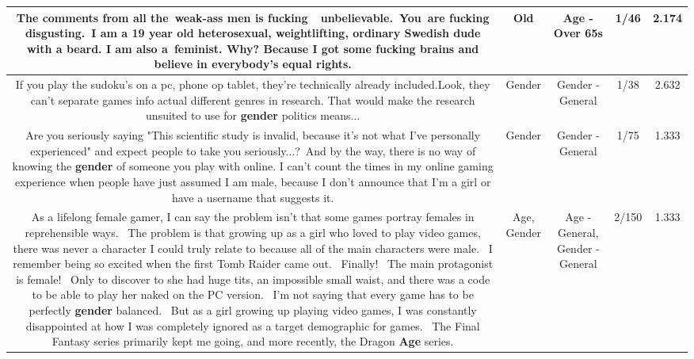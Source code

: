 \documentclass[11pt]{article}
\newlength\mylength
\begin{document}
\begin{center}
\begin{longtable}{|C{.65\mylength}|C{.30\mylength}|C{.12\mylength}|C{.12\mylength}|C{.12\mylength}|}
  \small The comments from all the weak-ass men is fucking  unbelievable. You are fucking disgusting. I am a 19 year \textbf{old} heterosexual, weightlifting, ordinary Swedish dude with a beard. I am also a feminist. Why? Because I got some fucking brains and believe in everybody's equal rights.\normalsize   & Old & Age - Over 65s & 1/46 & 2.174 \\  \hline
  \small If you play the sudoku's on a pc, phone op tablet, they're technically already included.Look, they can't separate games info actual different genres in research. That would make the research unsuited to use for \textbf{gender} politics means...\normalsize   & Gender & Gender - General & 1/38 & 2.632 \\  \hline
  \small {} Are you seriously saying "This scientific study is invalid, because it's not what I've personally experienced" and expect people to take you seriously...? And by the way, there is no way of knowing the \textbf{gender} of someone you play with online. I can't count the times in my online gaming experience when people have just assumed I am male, because I don't announce that I'm a girl or have a username that suggests it.\normalsize   & Gender & Gender - General & 1/75 & 1.333 \\  \hline
  \small As a lifelong female gamer, I can say the problem isn't that some games portray females in reprehensible ways.  The problem is that growing up as a girl who loved to play video games, there was never a character I could truly relate to because all of the main characters were male.  I remember being so excited when the first Tomb Raider came out.  Finally!  The main protagonist is female!  Only to discover to she had huge tits, an impossible small waist, and there was a code to be able to play her naked on the PC version.  I'm not saying that every game has to be perfectly \textbf{gender} balanced.  But as a girl growing up playing video games, I was constantly disappointed at how I was completely ignored as a target demographic for games.  The Final Fantasy series primarily kept me going, and more recently, the Dragon \textbf{Age} series.\normalsize   & Age, Gender & Age - General, Gender - General & 2/150 & 1.333 \\  \hline

\end{longtable}
\end{center}
\end{document}
